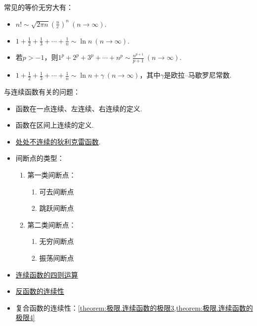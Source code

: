 常见的等价无穷大有：
\begin{itemize}
	\item \(n! \sim \sqrt{2 \pi n} \left( \frac{n}{e} \right)^n\ (n\to\infty)\).
	\item \(1+\frac12+\frac13+\dotsb+\frac1n \sim \ln n\ (n\to\infty)\).
	\item 若\(p>-1\)，则\(1^p+2^p+3^p+\dotsb+n^p \sim \frac{n^{p+1}}{p+1}\ (n\to\infty)\).%
	\item \(1+\frac12+\frac13+\dotsb+\frac1n \sim \ln n + \gamma\ (n\to\infty)\)，其中\(\gamma\)是欧拉--马歇罗尼常数.%
\end{itemize}

与连续函数有关的问题：
\begin{itemize}
	\item 函数在一点连续、左连续、右连续的定义.
	\item 函数在区间上连续的定义.
	\item \hyperref[example:连续函数.狄利克雷函数处处不连续]{处处不连续的狄利克雷函数}.
	\item 间断点的类型：\begin{enumerate}
		\item 第一类间断点：\begin{enumerate}
			\item 可去间断点
			\item 跳跃间断点
		\end{enumerate}
		\item 第二类间断点：\begin{enumerate}
			\item 无穷间断点
			\item 振荡间断点
		\end{enumerate}
	\end{enumerate}
	\item \hyperref[theorem:极限.连续函数的极限1]{连续函数的四则运算}
	\item \hyperref[theorem:极限.连续函数的极限2]{反函数的连续性}
	\item 复合函数的连续性：\cref{theorem:极限.连续函数的极限3,theorem:极限.连续函数的极限4}
\end{itemize}

